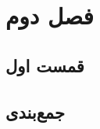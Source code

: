 
\chapter{فصل دوم}






\section{قمست اول}
\label{sec2:firstSection}


\section {جمع‌بندی}
\label{sec2:Conclution}
